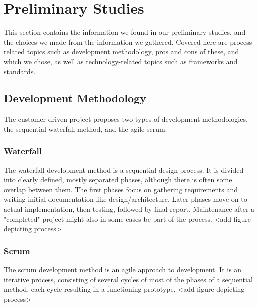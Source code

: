 \section{Preliminary Studies}
This section contains the information we found in our preliminary studies, and the choices we made from the information we gathered. Covered here are process-related topics such as development methodology, pros and cons of these, and which we chose, as well as technology-related topics such as frameworks and standards.
\subsection{Development Methodology}
The customer driven project proposes two types of development methodologies, the sequential waterfall method, and the agile scrum.
\subsubsection{Waterfall}
The waterfall development method is a sequential design process. It is divided into clearly defined, mostly separated phases, although there is often some overlap between them. The first phases focus on gathering requirements and writing initial documentation like design/architecture. Later phases move on to actual implementation, then testing, followed by final report. Maintenance after a "completed" project might also in some cases be part of the process. <add figure depicting process>
\subsubsection{Scrum}
The scrum development method is an agile approach to development. It is an iterative process, consisting of several cycles of most of the phases of a sequential method, each cycle resulting in a functioning prototype. <add figure depicting process>
